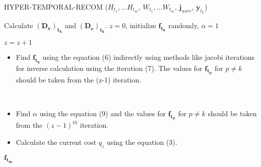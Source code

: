 \documentclass[conference]{IEEEtran}
\begin{document}
\begin{algorithm} %
\caption{HYPER-TEMPORAL-RECOM (${H_{t_1}, ... H_{t_m}}$, ${W_{t_1}, ... W_{t_m}}$, $\mathbf{j}_{user}$, $\mathbf{y}_{t_k}$)} %
\label{alg2} %
\begin{algorithmic} %

\STATE Calculate $\mathbf{(D_v)_{t_k}}$ and $\mathbf{(D_e)_{t_k}}$.
\STATE $z=0$, initialize $\mathbf{f_{t_k}}$ randomly, $\alpha=1$

\REPEAT
\STATE $z=z+1$


\begin{itemize}
\item{Find $\mathbf{f_{t_k}}$ using the equation (6) indirectly using methods like jacobi iterations for inverse calculation using the iteration (7). The values for $\mathbf{f_{t_p}}$ for $p \neq k$ should be taken from the (z-1) iteration.}
\end{itemize}

\ENDFOR \\

\begin{itemize}
\item{Find $\alpha$ using the equation (9) and the values for $\mathbf{f_{t_p}}$ for $p \neq k$ should be taken from the $(z-1)^{th}$ iteration.}
\item{Calculate the current cost $q_z$ using the equation (3).}
\end{itemize}


\RETURN $\mathbf{f_{t_m}}$

\end{algorithmic}
\end{algorithm}
\end{document}
